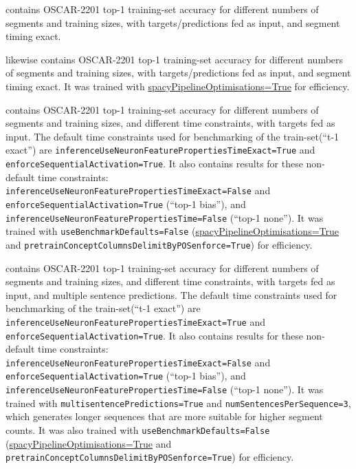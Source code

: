  contains OSCAR-2201 top-1 training-set accuracy for different numbers of segments and training sizes, with targets/predictions fed as input, and segment timing exact.

 likewise contains OSCAR-2201 top-1 training-set accuracy for different numbers of segments and training sizes, with targets/predictions fed as input, and segment timing exact. It was trained with \url{spacyPipelineOptimisations=True} for efficiency.

 contains OSCAR-2201 top-1 training-set accuracy for different numbers of segments and training sizes, and different time constraints, with targets fed as input. The default time constraints used for benchmarking of the train-set(``t-1 exact'') are \texttt{inferenceUseNeuronFeaturePropertiesTimeExact=True} and \texttt{enforceSequentialActivation=True}. It also contains results for these non-default time constraints: \texttt{inferenceUseNeuronFeaturePropertiesTimeExact=False} and \texttt{enforceSequentialActivation=True} (``top-1 bias''), and \texttt{inferenceUseNeuronFeaturePropertiesTime=False} (``top-1 none''). It was trained with \texttt{useBenchmarkDefaults=False} (\url{spacyPipelineOptimisations=True} and \texttt{pretrainConceptColumnsDelimitByPOSenforce=True}) for efficiency.

 contains OSCAR-2201 top-1 training-set accuracy for different numbers of segments and training sizes, and different time constraints, with targets fed as input, and multiple sentence predictions. The default time constraints used for benchmarking of the train-set(``t-1 exact'') are \texttt{inferenceUseNeuronFeaturePropertiesTimeExact=True} and \texttt{enforceSequentialActivation=True}. It also contains results for these non-default time constraints: \texttt{inferenceUseNeuronFeaturePropertiesTimeExact=False} and \texttt{enforceSequentialActivation=True} (``top-1 bias''), and \texttt{inferenceUseNeuronFeaturePropertiesTime=False} (``top-1 none''). It was trained with \texttt{multisentencePredictions=True} and \texttt{numSentencesPerSequence=3}, which generates longer sequences that are more suitable for higher segment counts. It was also trained with \texttt{useBenchmarkDefaults=False} (\url{spacyPipelineOptimisations=True} and \texttt{pretrainConceptColumnsDelimitByPOSenforce=True}) for efficiency.

